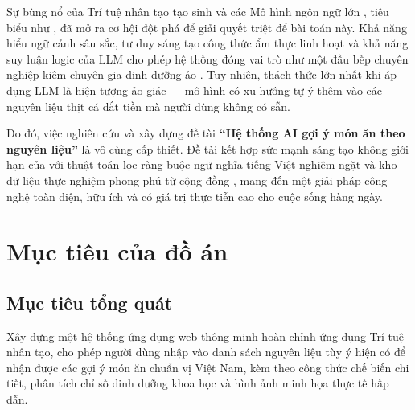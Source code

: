 Sự bùng nổ của Trí tuệ nhân tạo tạo sinh  và các Mô hình ngôn ngữ lớn , tiêu biểu như , đã mở ra cơ hội đột phá để giải quyết triệt để bài toán này. Khả năng hiểu ngữ cảnh sâu sắc, tư duy sáng tạo công thức ẩm thực linh hoạt và khả năng suy luận logic của LLM cho phép hệ thống đóng vai trò như một đầu bếp chuyên nghiệp kiêm chuyên gia dinh dưỡng ảo . Tuy nhiên, thách thức lớn nhất khi áp dụng LLM là hiện tượng ảo giác  --- mô hình có xu hướng tự ý thêm vào các nguyên liệu thịt cá đắt tiền mà người dùng không có sẵn. 

Do đó, việc nghiên cứu và xây dựng đề tài \textbf{``Hệ thống AI gợi ý món ăn theo nguyên liệu''} là vô cùng cấp thiết. Đề tài kết hợp sức mạnh sáng tạo không giới hạn của  với thuật toán lọc ràng buộc ngữ nghĩa tiếng Việt nghiêm ngặt và kho dữ liệu thực nghiệm phong phú từ cộng đồng , mang đến một giải pháp công nghệ toàn diện, hữu ích và có giá trị thực tiễn cao cho cuộc sống hàng ngày.

\section{Mục tiêu của đồ án}

\subsection{Mục tiêu tổng quát}
Xây dựng một hệ thống ứng dụng web thông minh hoàn chỉnh ứng dụng Trí tuệ nhân tạo, cho phép người dùng nhập vào danh sách nguyên liệu tùy ý hiện có để nhận được các gợi ý món ăn chuẩn vị Việt Nam, kèm theo công thức chế biến chi tiết, phân tích chỉ số dinh dưỡng khoa học và hình ảnh minh họa thực tế hấp dẫn.


